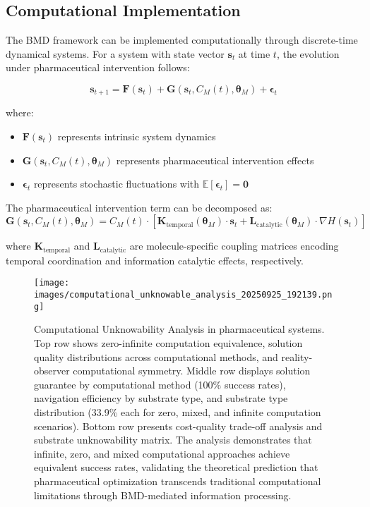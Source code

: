 \documentclass[12pt,a4paper]{article}
\begin{document}
\subsection{Computational Implementation}

The BMD framework can be implemented computationally through discrete-time dynamical systems. For a system with state vector $\mathbf{s}_t$ at time $t$, the evolution under pharmaceutical intervention follows:

\begin{equation}
\mathbf{s}_{t+1} = \mathbf{F}(\mathbf{s}_t) + \mathbf{G}(\mathbf{s}_t, C_M(t), \boldsymbol{\theta}_M) + \boldsymbol{\epsilon}_t
\end{equation}

where:
\begin{itemize}
\item $\mathbf{F}(\mathbf{s}_t)$ represents intrinsic system dynamics
\item $\mathbf{G}(\mathbf{s}_t, C_M(t), \boldsymbol{\theta}_M)$ represents pharmaceutical intervention effects
\item $\boldsymbol{\epsilon}_t$ represents stochastic fluctuations with $\mathbb{E}[\boldsymbol{\epsilon}_t] = \mathbf{0}$
\end{itemize}

The pharmaceutical intervention term can be decomposed as:
\begin{equation}
\mathbf{G}(\mathbf{s}_t, C_M(t), \boldsymbol{\theta}_M) = C_M(t) \cdot \left[ \mathbf{K}_{\text{temporal}}(\boldsymbol{\theta}_M) \cdot \mathbf{s}_t + \mathbf{L}_{\text{catalytic}}(\boldsymbol{\theta}_M) \cdot \nabla H(\mathbf{s}_t) \right]
\end{equation}

where $\mathbf{K}_{\text{temporal}}$ and $\mathbf{L}_{\text{catalytic}}$ are molecule-specific coupling matrices encoding temporal coordination and information catalytic effects, respectively.

\begin{figure}[htbp]
    \centering
    \texttt{[image: images/computational\_unknowable\_analysis\_20250925\_192139.png]}
    \caption{Computational Unknowability Analysis in pharmaceutical systems. Top row shows zero-infinite computation equivalence, solution quality distributions across computational methods, and reality-observer computational symmetry. Middle row displays solution guarantee by computational method (100\% success rates), navigation efficiency by substrate type, and substrate type distribution (33.9\% each for zero, mixed, and infinite computation scenarios). Bottom row presents cost-quality trade-off analysis and substrate unknowability matrix. The analysis demonstrates that infinite, zero, and mixed computational approaches achieve equivalent success rates, validating the theoretical prediction that pharmaceutical optimization transcends traditional computational limitations through BMD-mediated information processing.}
    \label{fig:computational_unknowable}
    \end{figure}
\end{document}
